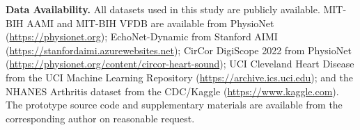 \documentclass[AMA,STIX1COL,]{WileyNJD-v2}
\begin{document}
\textbf{Data Availability.} All datasets used in this study are publicly available. MIT-BIH AAMI and MIT-BIH VFDB are available from PhysioNet (\url{https://physionet.org}); EchoNet-Dynamic from Stanford AIMI (\url{https://stanfordaimi.azurewebsites.net}); CirCor DigiScope 2022 from PhysioNet (\url{https://physionet.org/content/circor-heart-sound}); UCI Cleveland Heart Disease from the UCI Machine Learning Repository (\url{https://archive.ics.uci.edu}); and the NHANES Arthritis dataset from the CDC/Kaggle (\url{https://www.kaggle.com}). The prototype source code and supplementary materials are available from the corresponding author on reasonable request.
\end{document}
